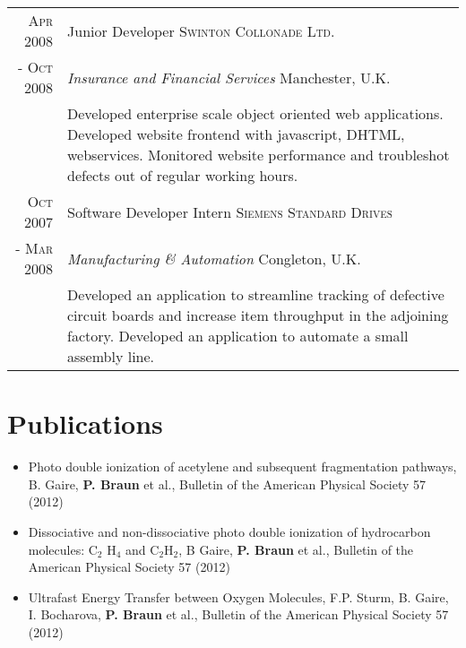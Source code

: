 \documentclass[a4paper,10pt]{article}
\begin{document}
\begin{tabularx}{19cm}{rX}
 \textsc{Apr 2008} & Junior Developer \hfill \textsc{Swinton Collonade Ltd.} \\
\textsc{- Oct 2008}&\emph{Insurance and Financial Services} \hfill  Manchester, U.K.\\
&\footnotesize{Developed enterprise scale object oriented web applications. Developed website frontend with javascript, DHTML, webservices. Monitored website performance and troubleshot defects out of regular working hours.}\vspace{2mm}\\ 

 \textsc{Oct 2007} & Software Developer Intern \hfill \textsc{Siemens Standard Drives}
\\\textsc{- Mar 2008}&\emph{Manufacturing \& Automation} \hfill  Congleton, U.K.
\\&\footnotesize{Developed an application to streamline tracking of defective circuit boards and increase item throughput in the adjoining factory. Developed an application to automate a small assembly line.}\vspace{2mm}\\ 

\end{tabularx}

\section{Publications}
\begin{itemize}
\item Photo double ionization of acetylene and subsequent fragmentation pathways, B. Gaire, \textbf{P. Braun} et al., Bulletin of the American Physical Society 57 (2012)
\item Dissociative and non-dissociative photo double ionization of hydrocarbon molecules: C$_{2}$ H$_{4} $ and C$_{2}$H$_{2}$, B Gaire, \textbf{P. Braun} et al., Bulletin of the American Physical Society 57 (2012)
\item Ultrafast Energy Transfer between Oxygen Molecules, F.P. Sturm, B. Gaire, I. Bocharova, \textbf{P. Braun} et al., Bulletin of the American Physical Society 57 (2012)
\end{itemize}
\end{document}

